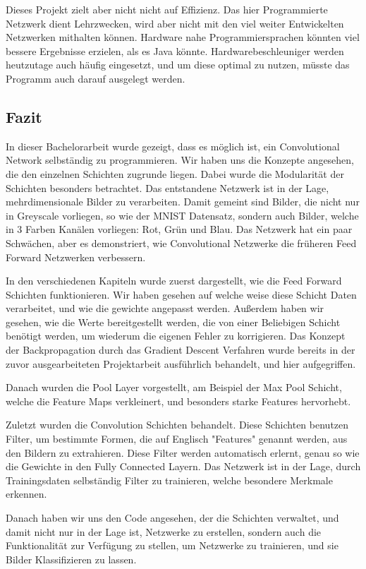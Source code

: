 \documentclass[12pt]{article}
\begin{document}
Dieses Projekt zielt aber nicht nicht auf Effizienz. Das hier Programmierte Netzwerk dient Lehrzwecken, wird aber nicht mit den viel weiter Entwickelten Netzwerken mithalten können. Hardware nahe Programmiersprachen könnten viel bessere Ergebnisse erzielen, als es Java könnte. Hardwarebeschleuniger werden heutzutage auch häufig eingesetzt, und um diese optimal zu nutzen, müsste das Programm auch darauf ausgelegt werden.

\subsection{Fazit}
In dieser Bachelorarbeit wurde gezeigt, dass es möglich ist, ein Convolutional Network selbständig zu programmieren. Wir haben uns die Konzepte angesehen, die den einzelnen Schichten zugrunde liegen. Dabei wurde die Modularität der Schichten besonders betrachtet. Das entstandene Netzwerk ist in der Lage, mehrdimensionale Bilder zu verarbeiten. Damit gemeint sind Bilder, die nicht nur in Greyscale vorliegen, so wie der MNIST Datensatz, sondern auch Bilder, welche in 3 Farben Kanälen vorliegen: Rot, Grün und Blau. Das Netzwerk hat ein paar Schwächen, aber es demonstriert, wie Convolutional Netzwerke die früheren Feed Forward Netzwerken verbessern.

In den verschiedenen Kapiteln wurde zuerst dargestellt, wie die Feed Forward Schichten funktionieren. Wir haben gesehen auf welche weise diese Schicht Daten verarbeitet, und wie die gewichte angepasst werden. Außerdem haben wir gesehen, wie die Werte bereitgestellt werden, die von einer Beliebigen Schicht benötigt werden, um wiederum die eigenen Fehler zu korrigieren. Das Konzept der Backpropagation durch das Gradient Descent Verfahren wurde bereits in der zuvor ausgearbeiteten Projektarbeit ausführlich behandelt, und hier aufgegriffen.

Danach wurden die Pool Layer vorgestellt, am Beispiel der Max Pool Schicht, welche die Feature Maps verkleinert, und besonders starke Features hervorhebt.

Zuletzt wurden die Convolution Schichten behandelt. Diese Schichten benutzen Filter, um bestimmte Formen, die auf Englisch "Features" genannt werden, aus den Bildern zu extrahieren. Diese Filter werden automatisch erlernt, genau so wie die Gewichte in den Fully Connected Layern. Das Netzwerk ist in der Lage, durch Trainingsdaten selbständig Filter zu trainieren, welche besondere Merkmale erkennen. 

Danach haben wir uns den Code angesehen, der die Schichten verwaltet, und damit nicht nur in der Lage ist, Netzwerke zu erstellen, sondern auch die Funktionalität zur Verfügung zu stellen, um Netzwerke zu trainieren, und sie Bilder Klassifizieren zu lassen.
\end{document}
